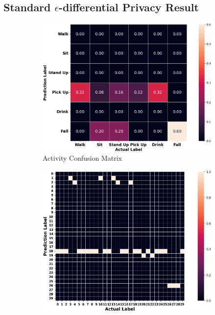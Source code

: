 \documentclass{l4proj}
\begin{document}
\begin{appendices}
\newpage

\subsection{Standard $\epsilon$-differential Privacy Result}
\begin{figure}[h]
    \centering
    \begin{subfigure}{0.49\textwidth}
        \includegraphics[width=\textwidth]{images/privacy-preservation-method1-activity-confusion-matrix.png}
        \caption{Activity Confusion Matrix}
        \label{fig:privacy-preservation-method1-activity-confusion-matrix}
    \end{subfigure}
    \qquad
    \begin{subfigure}{0.45\textwidth}
        \includegraphics[width=\textwidth]{images/privacy-preservation-method1-participant-confusion-matrix.png}

\end{subfigure}
\end{figure}
\end{appendices}
\end{document}
